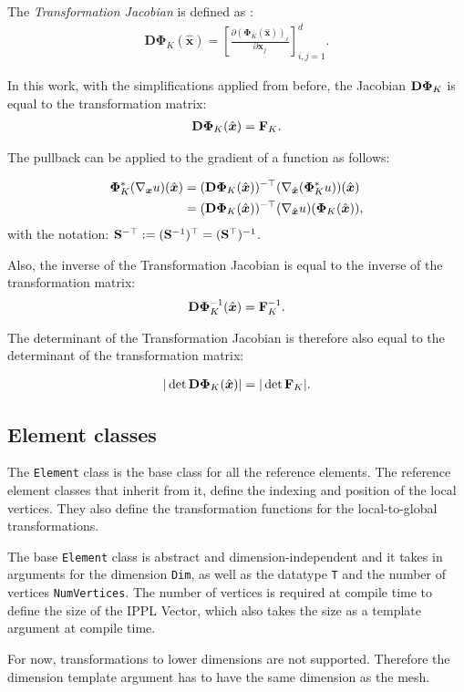 \begin{definition}
    The \emph{Transformation Jacobian} is defined as \cite{hiptmair_numerical_2023}:
    \begin{align}
        \mathbf{D\Phi}_K(\hat{\boldsymbol{x}})
        = \left[ \frac{\partial (\mathbf{\Phi}_K(\hat{\boldsymbol{x}}))_i}{\partial \boldsymbol{x}_j} \right]^d_{i,j = 1}.
    \end{align}
\end{definition}

In this work, with the simplifications applied from before, the Jacobian $\mathbf{D \Phi}_K$ is equal to the transformation matrix:
\begin{align}
    \mathbf{D\Phi}_K(\hat{\boldsymbol{x}}) = \mathbf{F}_K.
\end{align}

The pullback can be applied to the gradient of a function as follows:

\begin{align}
    \mathbf{\Phi}_{K}^{*}(\nabla_{\boldsymbol{x}} u)(\hat{\boldsymbol{x}})
     & = (\mathbf{D \Phi}_{K}(\hat{\boldsymbol{x}}))^{-\top}(\nabla_{\hat{\boldsymbol{x}}}(\mathbf{\Phi}^{*}_K u))(\hat{\boldsymbol{x}}) \\
     & = (\mathbf{D \Phi}_{K}(\hat{\boldsymbol{x}}))^{-\top}(\nabla_{\hat{\boldsymbol{x}}}u)(\mathbf{\Phi}_K(\hat{\boldsymbol{x}})),
\end{align}
with the notation: $\mathbf{S}^{-\top} := (\mathbf{S}^{-1})^\top = (\mathbf{S}^\top)^{-1}$.

Also, the inverse of the Transformation Jacobian is equal to the inverse of the transformation matrix:
\begin{align}
    \mathbf{D\Phi}_K^{-1}(\hat{\boldsymbol{x}}) = \mathbf{F}_K^{-1}.
\end{align}

The determinant of the Transformation Jacobian is therefore also equal to the determinant of the transformation matrix:

\begin{align}
    |\det \mathbf{D\Phi}_K(\hat{\boldsymbol{x}})| = |\det \mathbf{F}_K|.
\end{align}

\subsection{Element classes}

The \texttt{Element} class is the base class for all the reference elements.
The reference element classes that inherit from it, define the indexing and position of the local vertices.
They also define the transformation functions for the local-to-global transformations.

The base \texttt{Element} class is abstract and dimension-independent and it takes in arguments for the
dimension \texttt{Dim}, as well as the datatype \texttt{T} and the number of
vertices \texttt{NumVertices}. The number of vertices is required at compile time
to define the size of the IPPL Vector, which also takes the size as a template
argument at compile time.

For now, transformations to lower dimensions are not supported.
Therefore the dimension template argument has to have the same dimension as the mesh.
